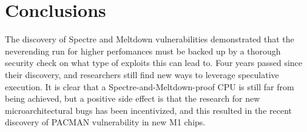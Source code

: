 \section{Conclusions}
The discovery of Spectre and Meltdown vulnerabilities demonstrated that the neverending run for higher perfomances must be backed up by a thorough security check on what type of exploits this can lead to. 
Four years passed since their discovery, and researchers still find new ways to leverage speculative execution.
It is clear that a Spectre-and-Meltdown-proof CPU is still far from being achieved, but a positive side effect is that the research for new microarchitectural bugs has been incentivized, and this resulted in the recent discovery of PACMAN vulnerability in new M1 chips.
